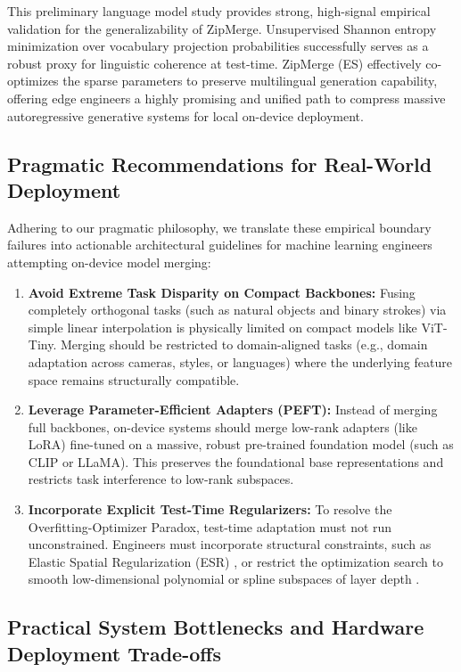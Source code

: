 This preliminary language model study provides strong, high-signal empirical validation for the generalizability of ZipMerge. Unsupervised Shannon entropy minimization over vocabulary projection probabilities successfully serves as a robust proxy for linguistic coherence at test-time. ZipMerge (ES) effectively co-optimizes the sparse parameters to preserve multilingual generation capability, offering edge engineers a highly promising and unified path to compress massive autoregressive generative systems for local on-device deployment.

\subsection{Pragmatic Recommendations for Real-World Deployment}

Adhering to our pragmatic philosophy, we translate these empirical boundary failures into actionable architectural guidelines for machine learning engineers attempting on-device model merging:

\begin{enumerate}[leftmargin=*]
    \item \textbf{Avoid Extreme Task Disparity on Compact Backbones:} Fusing completely orthogonal tasks (such as natural objects and binary strokes) via simple linear interpolation is physically limited on compact models like ViT-Tiny. Merging should be restricted to domain-aligned tasks (e.g., domain adaptation across cameras, styles, or languages) where the underlying feature space remains structurally compatible.
    \item \textbf{Leverage Parameter-Efficient Adapters (PEFT):} Instead of merging full backbones, on-device systems should merge low-rank adapters (like LoRA) fine-tuned on a massive, robust pre-trained foundation model (such as CLIP or LLaMA). This preserves the foundational base representations and restricts task interference to low-rank subspaces.
    \item \textbf{Incorporate Explicit Test-Time Regularizers:} To resolve the Overfitting-Optimizer Paradox, test-time adaptation must not run unconstrained. Engineers must incorporate structural constraints, such as Elastic Spatial Regularization (ESR) \cite{daheim2023elastic}, or restrict the optimization search to smooth low-dimensional polynomial or spline subspaces of layer depth \cite{sanford2023representing}.
\end{enumerate}

\subsection{Practical System Bottlenecks and Hardware Deployment Trade-offs}

